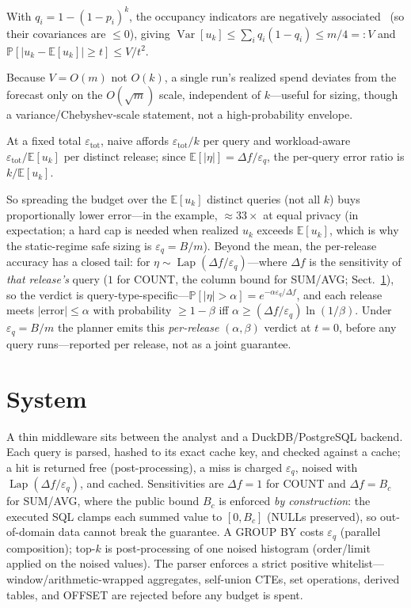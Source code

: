 \documentclass[runningheads]{llncs}
\newcommand{\eps}{\varepsilon}
\newcommand{\E}{\mathbb{E}}
\newcommand{\Prob}{\mathbb{P}}
\DeclareMathOperator{\Lap}{Lap}
\DeclareMathOperator{\Var}{Var}
\begin{document}
\begin{proposition}[Concentration]\label{prop:conc}
With $q_i=1-(1-p_i)^k$, the occupancy indicators are negatively associated~\cite{joagdev1983} (so their covariances are $\le0$), giving $\Var[u_k]\le\sum_i q_i(1-q_i)\le m/4=:V$ and $\Prob[|u_k-\E[u_k]|\ge t]\le V/t^2$.
\end{proposition}
\noindent Because $V=O(m)$ not $O(k)$, a single run's realized spend deviates from the forecast only on the $O(\sqrt m)$ scale, independent of $k$---useful for sizing, though a variance/Chebyshev-scale statement, not a high-probability envelope.

\begin{proposition}\label{prop:util}
At a fixed total $\eps_{\mathrm{tot}}$, naive affords $\eps_{\mathrm{tot}}/k$ per query and workload-aware $\eps_{\mathrm{tot}}/\E[u_k]$ per distinct release; since $\E[|\eta|]=\Delta f/\eps_q$, the per-query error ratio is $k/\E[u_k]$.
\end{proposition}
\noindent So spreading the budget over the $\E[u_k]$ distinct queries (not all $k$) buys proportionally lower error---in the example, $\approx33\times$ at equal privacy (in expectation; a hard cap is needed when realized $u_k$ exceeds $\E[u_k]$, which is why the static-regime safe sizing is $\eps_q=B/m$). Beyond the mean, the per-release accuracy has a closed tail: for $\eta\sim\Lap(\Delta f/\eps_q)$---where $\Delta f$ is the sensitivity of \emph{that release's} query ($1$ for COUNT, the column bound for SUM/AVG; Sect.~\ref{sec:system}), so the verdict is query-type-specific---$\Prob[|\eta|>\alpha]=e^{-\alpha\eps_q/\Delta f}$, and each release meets $|\text{error}|\le\alpha$ with probability $\ge1-\beta$ iff $\alpha\ge(\Delta f/\eps_q)\ln(1/\beta)$. Under $\eps_q{=}B/m$ the planner emits this \emph{per-release} $(\alpha,\beta)$ verdict at $t{=}0$, before any query runs---reported per release, not as a joint guarantee.

\section{System}
\label{sec:system}

A thin middleware sits between the analyst and a DuckDB/PostgreSQL backend. Each query is parsed, hashed to its exact cache key, and checked against a cache; a hit is returned free (post-processing), a miss is charged $\eps_q$, noised with $\Lap(\Delta f/\eps_q)$, and cached. Sensitivities are $\Delta f=1$ for COUNT and $\Delta f=B_c$ for SUM/AVG, where the public bound $B_c$ is enforced \emph{by construction}: the executed SQL clamps each summed value to $[0,B_c]$ (NULLs preserved), so out-of-domain data cannot break the guarantee. A GROUP BY costs $\eps_q$ (parallel composition); top-$k$ is post-processing of one noised histogram (order/limit applied on the noised values). The parser enforces a strict positive whitelist---window/arithmetic-wrapped aggregates, self-union CTEs, set operations, derived tables, and OFFSET are rejected before any budget is spent.
\end{document}
